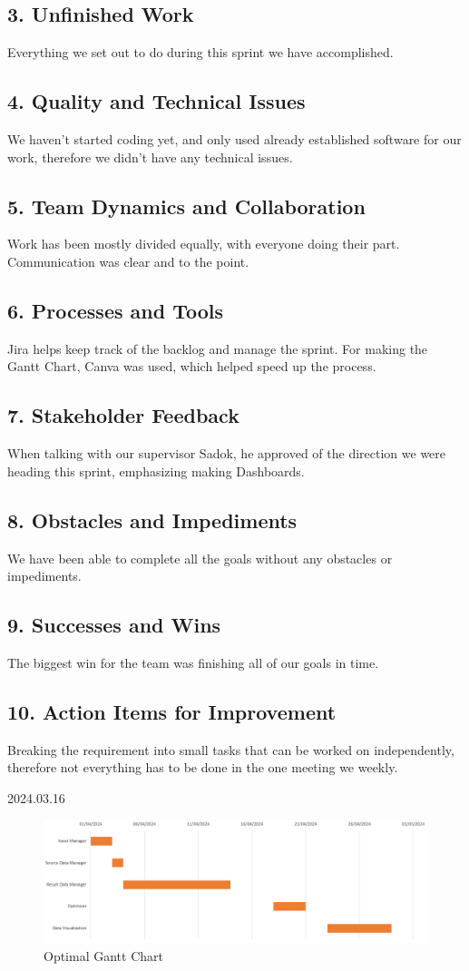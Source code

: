 \documentclass[12pt]{report}
\begin{document}
\subsection*{3. Unfinished Work}
Everything we set out to do during this sprint we have accomplished.
\subsection*{4. Quality and Technical Issues}
We haven't started coding yet, and only used already established software for our work, therefore we didn't have any technical issues.
\subsection*{5. Team Dynamics and Collaboration}
Work has been mostly divided equally, with everyone doing their part. Communication was clear and to the point.
\subsection*{6. Processes and Tools}
Jira helps keep track of the backlog and manage the sprint. For making the Gantt Chart, Canva was used, which helped speed up the process.
\subsection*{7. Stakeholder Feedback}
When talking with our supervisor Sadok, he approved of the direction we were heading this sprint, emphasizing making Dashboards.
\subsection*{8. Obstacles and Impediments}
We have been able to complete all the goals without any obstacles or impediments.
\subsection*{9. Successes and Wins}
The biggest win for the team was finishing all of our goals in time.
\subsection*{10. Action Items for Improvement}
Breaking the requirement into small tasks that can be worked on independently, therefore not everything has to be done in the one meeting we weekly.

\hfill 2024.03.16


\begin{figure}[H]
  \centering
  \includegraphics[width=1\textwidth]{Resources/1-Sprint/Gantt-Chart-Optimal.png}
  \caption{Optimal Gantt Chart}
  \label{fig:OptGanttChart-image}
\end{figure}
\end{document}
